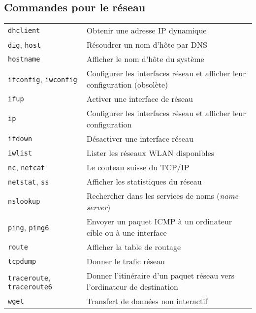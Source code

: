 \documentclass[10pt,a4paper]{article}
\begin{document}
\begin{multicols}{2}

\section{Commandes pour le réseau}
\begin{tabular}{ p{2.5cm} p{8.5cm} }
  \hline
  \texttt{dhclient} & Obtenir une adresse IP dynamique \\
  \rowcolor{Gray}
  \texttt{dig}, \texttt{host} & Résoudrer un nom d'hôte par DNS \\
  \texttt{hostname} & Afficher le nom d'hôte du système \\
  \rowcolor{Gray}
  \texttt{ifconfig}, \texttt{iwconfig} & Configurer les interfaces réseau et afficher leur confi\-guration (obsolète)\\
  \texttt{ifup} & Activer une interface de réseau\\
  \rowcolor{Gray}
  \texttt{ip} & Configurer les interfaces réseau et afficher leur confi\-guration\\
  \texttt{ifdown} & Désactiver une interface réseau \\
  \rowcolor{Gray}
  \texttt{iwlist} & Lister les réseaux WLAN disponibles\\
  \texttt{nc}, \texttt{netcat} & Le couteau suisse du TCP/IP \\
  \rowcolor{Gray}
  \texttt{netstat}, \texttt{ss} & Afficher les statistiques du réseau \\
  \texttt{nslookup} & Rechercher dans les services de noms (\textit{name server}) \\
  \rowcolor{Gray}
  \texttt{ping}, \texttt{ping6} & Envoyer un paquet ICMP à un ordinateur cible ou à une interface\\
  \texttt{route} & Afficher la table de routage \\
  \rowcolor{Gray}
  \texttt{tcpdump} & Donner le trafic réseau \\
  \texttt{traceroute}, \texttt{traceroute6} & Donner l'itinéraire d'un paquet réseau vers \newline l'ordinateur de destination \\
  \rowcolor{Gray}
  \texttt{wget} & Transfert de données non interactif \\
  \hline
\end{tabular}

\hfill
~ \\
~ \\


\end{multicols}
\end{document}
